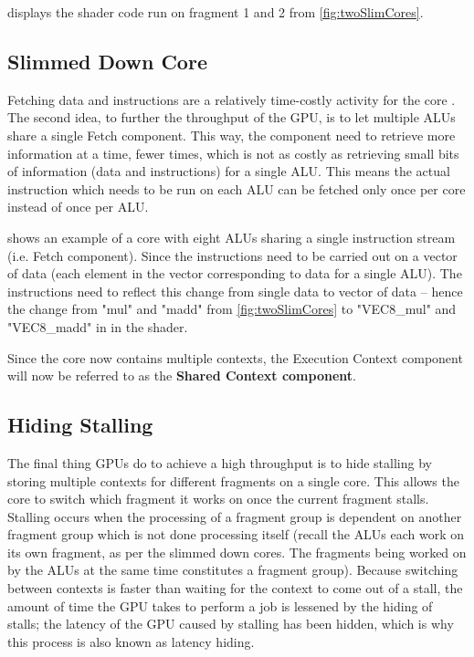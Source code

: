  displays the shader code run on fragment 1 and 2 from \cref{fig:twoSlimCores}.

\subsection{Slimmed Down Core}
Fetching data and instructions are a relatively time-costly activity for the core  .
The second idea, to further the throughput of the \gls{GPU}, is to let multiple \glspl{ALU} share a single Fetch component.
This way, the component need to retrieve more information at a time, fewer times, which is not as costly as retrieving small bits of information (data and instructions) for a single \gls{ALU}.
This means the actual instruction which needs to be run on each \gls{ALU} can be fetched only once per core instead of once per \gls{ALU}.


 shows an example of a core with eight \glspl{ALU} sharing a single instruction stream (i.e. Fetch component).
Since the instructions need to be carried out on a vector of data (each element in the vector corresponding to data for a single \gls{ALU}).
The instructions need to reflect this change from single data to vector of data -- hence the change from "mul" and "madd" from \cref{fig:twoSlimCores} to "VEC8\_mul" and "VEC8\_madd" in  in the shader.

Since the core now contains multiple contexts, the Execution Context component will now be referred to as the \textbf{Shared Context component}.

\subsection{Hiding Stalling}
The final thing \glspl{GPU} do to achieve a high throughput is to hide stalling by storing multiple contexts for different fragments on a single core. 
This allows the core to switch which fragment it works on once the current fragment stalls.
Stalling occurs when the processing of a fragment group is dependent on another fragment group which is not done processing itself (recall the \glspl{ALU} each work on its own fragment, as per the slimmed down cores.
The fragments being worked on by the \glspl{ALU} at the same time constitutes a fragment group).
Because switching between contexts is faster than waiting for the context to come out of a stall, the amount of time the \gls{GPU} takes to perform a job is lessened by the hiding of stalls; the latency of the \gls{GPU} caused by stalling has been hidden, which is why this process is also known as latency hiding.

